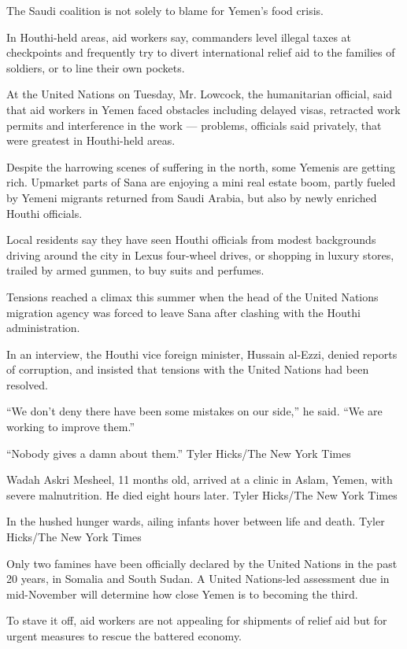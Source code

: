 The Saudi coalition is not solely to blame for Yemen's food crisis.

In Houthi-held areas, aid workers say, commanders level illegal taxes at
checkpoints and frequently try to divert international relief aid to the
families of soldiers, or to line their own pockets.

At the United Nations on Tuesday, Mr. Lowcock, the humanitarian
official, said that aid workers in Yemen faced obstacles including
delayed visas, retracted work permits and interference in the work ---
problems, officials said privately, that were greatest in Houthi-held
areas.

Despite the harrowing scenes of suffering in the north, some Yemenis are
getting rich. Upmarket parts of Sana are enjoying a mini real estate
boom, partly fueled by Yemeni migrants returned from Saudi Arabia, but
also by newly enriched Houthi officials.

Local residents say they have seen Houthi officials from modest
backgrounds driving around the city in Lexus four-wheel drives, or
shopping in luxury stores, trailed by armed gunmen, to buy suits and
perfumes.

Tensions reached a climax this summer when the head of the United
Nations migration agency was forced to leave Sana after clashing with
the Houthi administration.

In an interview, the Houthi vice foreign minister, Hussain al-Ezzi,
denied reports of corruption, and insisted that tensions with the United
Nations had been resolved.

``We don't deny there have been some mistakes on our side,'' he said.
``We are working to improve them.''

``Nobody gives a damn about them.'' Tyler Hicks/The New York Times

Wadah Askri Mesheel, 11 months old, arrived at a clinic in Aslam, Yemen,
with severe malnutrition. He died eight hours later. Tyler Hicks/The New
York Times

In the hushed hunger wards, ailing infants hover between life and death.
Tyler Hicks/The New York Times

Only two famines have been officially declared by the United Nations in
the past 20 years, in Somalia and South Sudan. A United Nations-led
assessment due in mid-November will determine how close Yemen is to
becoming the third.

To stave it off, aid workers are not appealing for shipments of relief
aid but for urgent measures to rescue the battered economy.

